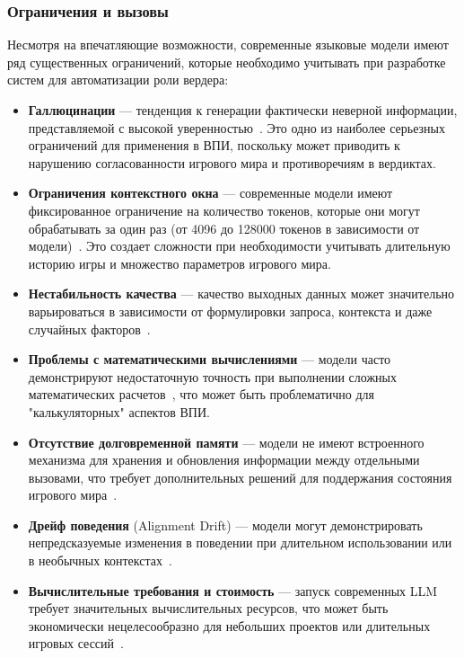 \subsubsection{Ограничения и вызовы}

Несмотря на впечатляющие возможности, современные языковые модели имеют ряд существенных ограничений, которые необходимо учитывать при разработке систем для автоматизации роли вердера:

\begin{itemize}
    \item \textbf{Галлюцинации} — тенденция к генерации фактически неверной информации, представляемой с высокой уверенностью~\cite{ji2023survey}. Это одно из наиболее серьезных ограничений для применения в ВПИ, поскольку может приводить к нарушению согласованности игрового мира и противоречиям в вердиктах.

    \item \textbf{Ограничения контекстного окна} — современные модели имеют фиксированное ограничение на количество токенов, которые они могут обрабатывать за один раз (от 4096 до 128000 токенов в зависимости от модели)~\cite{liu2023lost}. Это создает сложности при необходимости учитывать длительную историю игры и множество параметров игрового мира.

    \item \textbf{Нестабильность качества} — качество выходных данных может значительно варьироваться в зависимости от формулировки запроса, контекста и даже случайных факторов~\cite{zhao2021calibrate}.

    \item \textbf{Проблемы с математическими вычислениями} — модели часто демонстрируют недостаточную точность при выполнении сложных математических расчетов~\cite{patel2021nlp}, что может быть проблематично для "калькуляторных" аспектов ВПИ.

    \item \textbf{Отсутствие долговременной памяти} — модели не имеют встроенного механизма для хранения и обновления информации между отдельными вызовами, что требует дополнительных решений для поддержания состояния игрового мира~\cite{karpas2022mrkl}.

    \item \textbf{Дрейф поведения} (Alignment Drift) — модели могут демонстрировать непредсказуемые изменения в поведении при длительном использовании или в необычных контекстах~\cite{ouyang2022training}.

    \item \textbf{Вычислительные требования и стоимость} — запуск современных LLM требует значительных вычислительных ресурсов, что может быть экономически нецелесообразно для небольших проектов или длительных игровых сессий~\cite{patterson2021carbon}.
\end{itemize}

